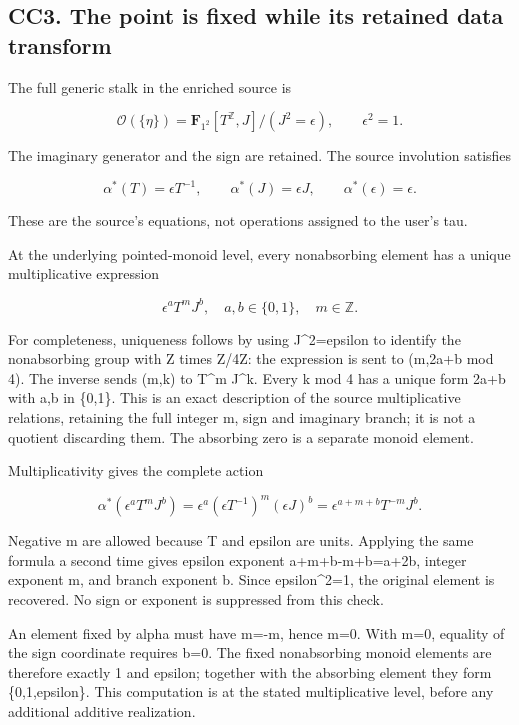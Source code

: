 \documentclass[
  11pt,
]{article}
\begin{document}
\subsection{CC3. The point is fixed while its retained data
transform}\label{cc3.-the-point-is-fixed-while-its-retained-data-transform}

The full generic stalk in the enriched source is

\[
\mathcal O(\{\eta\})
=\mathbf F_{1^2}[T^{\mathbb Z},J]/(J^2=\epsilon),
\qquad \epsilon^2=1.
\]

The imaginary generator and the sign are retained. The source involution
satisfies

\[
\alpha^*(T)=\epsilon T^{-1},\qquad
\alpha^*(J)=\epsilon J,\qquad
\alpha^*(\epsilon)=\epsilon.
\]

These are the source's equations, not operations assigned to the user's
tau.

At the underlying pointed-monoid level, every nonabsorbing element has a
unique multiplicative expression

\[
\epsilon^a T^m J^b,
\quad a,b\in\{0,1\},\quad m\in\mathbb Z.
\]

For completeness, uniqueness follows by using J\^{}2=epsilon to identify
the nonabsorbing group with Z times Z/4Z: the expression is sent to
(m,2a+b mod 4). The inverse sends (m,k) to T\^{}m J\^{}k. Every k mod 4
has a unique form 2a+b with a,b in \{0,1\}. This is an exact description
of the source multiplicative relations, retaining the full integer m,
sign and imaginary branch; it is not a quotient discarding them. The
absorbing zero is a separate monoid element.

Multiplicativity gives the complete action

\[
\alpha^*(\epsilon^a T^m J^b)
=\epsilon^a(\epsilon T^{-1})^m(\epsilon J)^b
=\epsilon^{a+m+b}T^{-m}J^b.
\]

Negative m are allowed because T and epsilon are units. Applying the
same formula a second time gives epsilon exponent a+m+b-m+b=a+2b,
integer exponent m, and branch exponent b. Since epsilon\^{}2=1, the
original element is recovered. No sign or exponent is suppressed from
this check.

An element fixed by alpha must have m=-m, hence m=0. With m=0, equality
of the sign coordinate requires b=0. The fixed nonabsorbing monoid
elements are therefore exactly 1 and epsilon; together with the
absorbing element they form \{0,1,epsilon\}. This computation is at the
stated multiplicative level, before any additional additive realization.
\end{document}
